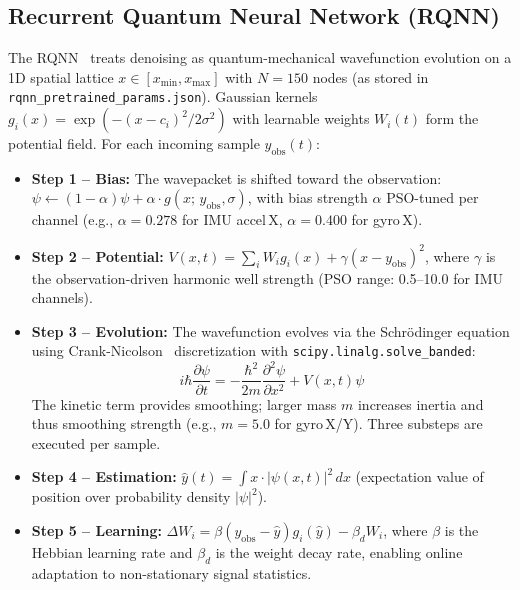 \documentclass[conference]{IEEEtran}
\begin{document}
\subsection{Recurrent Quantum Neural Network (RQNN)}

The RQNN~\cite{gandhi2014} treats denoising as quantum-mechanical wavefunction
evolution on a 1D spatial lattice $x \in [x_{\min}, x_{\max}]$ with $N = 150$
nodes (as stored in \texttt{rqnn\_pretrained\_params.json}). Gaussian kernels
$g_i(x) = \exp(-(x-c_i)^2 / 2\sigma^2)$ with learnable weights $W_i(t)$ form the
potential field. For each incoming sample $y_{\text{obs}}(t)$:
\begin{itemize}[leftmargin=1.5em, itemsep=3pt]
\item \textbf{Step 1 -- Bias:} The wavepacket is shifted toward the observation:
      $\psi \leftarrow (1-\alpha)\psi + \alpha \cdot g(x;\,y_{\text{obs}},\sigma)$,
      with bias strength $\alpha$ PSO-tuned per channel
      (e.g., $\alpha = 0.278$ for IMU accel\,X, $\alpha = 0.400$ for gyro\,X).
\item \textbf{Step 2 -- Potential:}
      $V(x,t) = \sum_i W_i g_i(x) + \gamma(x - y_{\text{obs}})^2$, where $\gamma$
      is the observation-driven harmonic well strength (PSO range: 0.5--10.0 for IMU
      channels).
\item \textbf{Step 3 -- Evolution:} The wavefunction evolves via the
      Schr\"{o}dinger equation using Crank-Nicolson~\cite{cranknicolson}
      discretization with \texttt{scipy.linalg.solve\_banded}:
      \begin{equation}
        i\hbar \frac{\partial \psi}{\partial t} =
        -\frac{\hbar^2}{2m}\frac{\partial^2 \psi}{\partial x^2} + V(x,t)\psi
      \end{equation}
      The kinetic term provides smoothing; larger mass $m$ increases inertia and
      thus smoothing strength (e.g., $m = 5.0$ for gyro\,X/Y). Three substeps are
      executed per sample.
\item \textbf{Step 4 -- Estimation:}
      $\hat{y}(t) = \int x \cdot |\psi(x,t)|^2 \, dx$ (expectation value of
      position over probability density $|\psi|^2$).
\item \textbf{Step 5 -- Learning:}
      $\Delta W_i = \beta (y_{\text{obs}} - \hat{y}) g_i(\hat{y}) - \beta_d W_i$,
      where $\beta$ is the Hebbian learning rate and $\beta_d$ is the weight decay
      rate, enabling online adaptation to non-stationary signal statistics.
\end{itemize}
\end{document}
